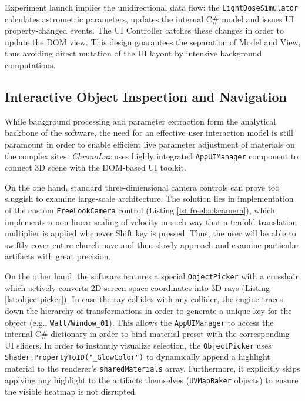 Experiment launch implies the unidirectional data flow: the \texttt{LightDoseSimulator} calculates astrometric parameters, updates the internal C\# model and issues UI property-changed events. The UI Controller catches these changes in order to update the DOM view. This design guarantees the separation of Model and View, thus avoiding direct mutation of the UI layout by intensive background computations.

\subsection{Interactive Object Inspection and Navigation}

While background processing and parameter extraction form the analytical backbone of the software, the need for an effective user interaction model is still paramount in order to enable efficient live parameter adjustment of materials on the complex sites. \textit{ChronoLux} uses highly integrated \texttt{AppUIManager} component to connect 3D scene with the DOM-based UI toolkit.

On the one hand, standard three-dimensional camera controls can prove too sluggish to examine large-scale architecture. The solution lies in implementation of the custom \texttt{FreeLookCamera} control (Listing \ref{lst:freelookcamera}), which implements a non-linear scaling of velocity in such way that a tenfold translation multiplier is applied whenever Shift key is pressed. Thus, the user will be able to swiftly cover entire church nave and then slowly approach and examine particular artifacts with great precision.

On the other hand, the software features a special \texttt{ObjectPicker} with a crosshair which actively converts 2D screen space coordinates into 3D rays (Listing \ref{lst:objectpicker}). In case the ray collides with any collider, the engine traces down the hierarchy of transformations in order to generate a unique key for the object (e.g., \texttt{Wall/Window\_01}). This allows the \texttt{AppUIManager} to access the internal C\# dictionary in order to bind material preset with the corresponding UI sliders. In order to instantly visualize selection, the \texttt{ObjectPicker} uses \texttt{Shader.PropertyToID("\_GlowColor")} to dynamically append a highlight material to the renderer's \texttt{sharedMaterials} array. Furthermore, it explicitly skips applying any highlight to the artifacts themselves (\texttt{UVMapBaker} objects) to ensure the visible heatmap is not disrupted.

